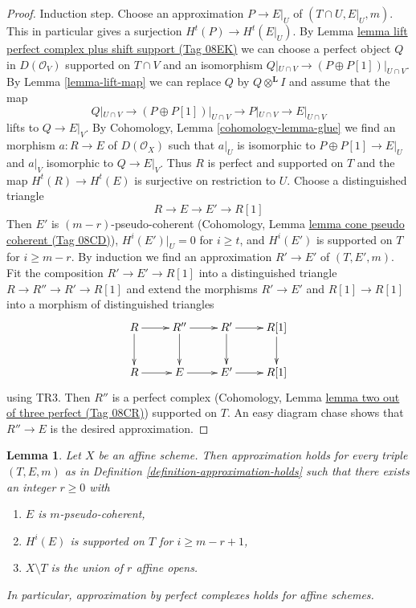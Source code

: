 \documentclass{amsart}
\theoremstyle{plain}
\newtheorem{lemma}[subsection]{Lemma}
\theoremstyle{definition}
\theoremstyle{remark}
\numberwithin{equation}{subsection}
\begin{document}
\begin{proof}
\medskip\noindent
Induction step. Choose an approximation $P \to E|_U$
of $(T \cap U, E|_U, m)$. This in particular gives a surjection
$H^t(P) \to H^t(E|_U)$. By
Lemma \href{https://stacks.math.columbia.edu/tag/08EK}{lemma lift perfect complex plus shift support (Tag 08EK)}
we can choose a perfect object $Q$ in $D(\mathcal{O}_V)$
supported on $T \cap V$ and an isomorphism
$Q|_{U \cap V} \to (P \oplus P[1])|_{U \cap V}$.
By Lemma \ref{lemma-lift-map} we can replace $Q$ by
$Q \otimes^\mathbf{L} I$
and assume that the map
$$
Q|_{U \cap V} \to (P \oplus P[1])|_{U \cap V}
\longrightarrow P|_{U \cap V}
\longrightarrow
E|_{U \cap V}
$$
lifts to $Q \to E|_V$. By
Cohomology, Lemma \ref{cohomology-lemma-glue}
we find an morphism $a : R \to E$ of $D(\mathcal{O}_X)$
such that $a|_U$ is isomorphic to $P \oplus P[1] \to E|_U$
and $a|_V$ isomorphic to $Q \to E|_V$.
Thus $R$ is perfect and supported on $T$
and the map $H^t(R) \to H^t(E)$ is surjective on restriction to $U$.
Choose a distinguished triangle
$$
R \to E \to E' \to R[1]
$$
Then $E'$ is $(m - r)$-pseudo-coherent
(Cohomology, Lemma \href{https://stacks.math.columbia.edu/tag/08CD}{lemma cone pseudo coherent (Tag 08CD)}),
$H^i(E')|_U = 0$ for $i \geq t$, and
$H^i(E')$ is supported on $T$ for $i \geq m - r$.
By induction we find an approximation $R' \to E'$
of $(T, E', m)$. Fit the composition $R' \to E' \to R[1]$
into a distinguished triangle $R \to R'' \to R' \to R[1]$
and extend the morphisms $R' \to E'$ and $R[1] \to R[1]$ into
a morphism of distinguished triangles
$$
\xymatrix{
R \ar[r] \ar[d] & R'' \ar[d] \ar[r] & R' \ar[d] \ar[r] & R[1] \ar[d] \\
R \ar[r] &  E \ar[r] & E' \ar[r] & R[1]
}
$$
using TR3. Then $R''$ is a perfect complex
(Cohomology, Lemma \href{https://stacks.math.columbia.edu/tag/08CR}{lemma two out of three perfect (Tag 08CR)})
supported on $T$.
An easy diagram chase shows that $R'' \to E$ is the desired
approximation.
\end{proof}


\begin{lemma}
\label{lemma-approximation-affine}
Let $X$ be an affine scheme. Then approximation holds for every
triple $(T, E, m)$ as in Definition \ref{definition-approximation-holds}
such that there exists an integer $r \geq 0$ with
\begin{enumerate}
\item $E$ is $m$-pseudo-coherent,
\item $H^i(E)$ is supported on $T$ for $i \geq m - r + 1$,
\item $X \setminus T$ is the union of $r$ affine opens.
\end{enumerate}
In particular, approximation by perfect complexes holds for affine schemes.
\end{lemma}
\end{document}
